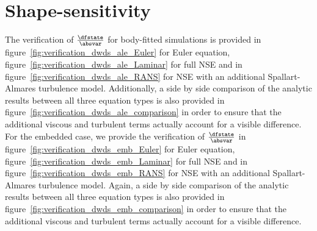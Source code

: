 \documentclass[../main.tex]{subfiles}
\begin{document}
\FloatBarrier



\section{Shape-sensitivity}
The verification of $\tfrac{\dfstate}{\absvar}$ for body-fitted simulations is provided in figure~\ref{fig:verification_dwds_ale_Euler} for Euler equation, figure~\ref{fig:verification_dwds_ale_Laminar} for full \ac{NSE} and in figure~\ref{fig:verification_dwds_ale_RANS} for \ac{NSE} with an additional Spallart-Almares turbulence model.
Additionally, a side by side comparison of the analytic results between all three equation types is also provided in figure~\ref{fig:verification_dwds_ale_comparison} in order to ensure that the additional viscous and turbulent terms actually account for a visible difference.
\\
For the embedded case, we provide the verification of $\tfrac{\dfstate}{\absvar}$  in figure~\ref{fig:verification_dwds_emb_Euler} for Euler equation, figure~\ref{fig:verification_dwds_emb_Laminar} for full \ac{NSE} and in figure~\ref{fig:verification_dwds_emb_RANS} for \ac{NSE} with an additional Spallart-Almares turbulence model.
Again, a side by side comparison of the analytic results between all three equation types is also provided in figure~\ref{fig:verification_dwds_emb_comparison} in order to ensure that the additional viscous and turbulent terms actually account for a visible difference.
\end{document}
